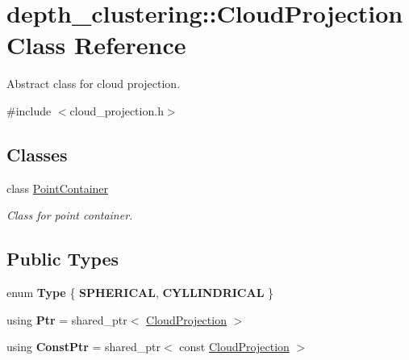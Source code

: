 \hypertarget{classdepth__clustering_1_1CloudProjection}{\section{depth\-\_\-clustering\-:\-:Cloud\-Projection Class Reference}
\label{classdepth__clustering_1_1CloudProjection}
}


Abstract class for cloud projection.  




{\ttfamily \#include $<$cloud\-\_\-projection.\-h$>$}

\subsection*{Classes}
\begin{DoxyCompactItemize}
\item 
class \hyperlink{classdepth__clustering_1_1CloudProjection_1_1PointContainer}{Point\-Container}
\begin{DoxyCompactList}\small\item\em Class for point container. \end{DoxyCompactList}\end{DoxyCompactItemize}
\subsection*{Public Types}
\begin{DoxyCompactItemize}
\item 
enum {\bfseries Type} \{ {\bfseries S\-P\-H\-E\-R\-I\-C\-A\-L}, 
{\bfseries C\-Y\-L\-L\-I\-N\-D\-R\-I\-C\-A\-L}
 \}
\item 
\hypertarget{classdepth__clustering_1_1CloudProjection_a7ac49f27b97e149be239a777587b4162}{using {\bfseries Ptr} = shared\-\_\-ptr$<$ \hyperlink{classdepth__clustering_1_1CloudProjection}{Cloud\-Projection} $>$}\label{classdepth__clustering_1_1CloudProjection_a7ac49f27b97e149be239a777587b4162}

\item 
\hypertarget{classdepth__clustering_1_1CloudProjection_aa7a2a7f37a6ebd5533e336e1f484567a}{using {\bfseries Const\-Ptr} = shared\-\_\-ptr$<$ const \hyperlink{classdepth__clustering_1_1CloudProjection}{Cloud\-Projection} $>$}\label{classdepth__clustering_1_1CloudProjection_aa7a2a7f37a6ebd5533e336e1f484567a}

\end{DoxyCompactItemize}
